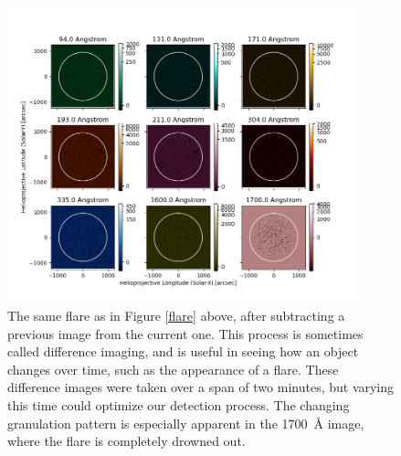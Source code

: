 \documentclass[12pt, letterpaper]{article}
\begin{document}
\begin{figure}[ht]
	\includegraphics[width=0.9\textwidth]{figures/0819_flare_diff.png}
	\centering
	\caption{The same flare as in Figure \ref{flare} above, after subtracting a previous image from the current one. This process is sometimes called difference imaging, and is useful in seeing how an object changes over time, such as the appearance of a flare. These difference images were taken over a span of two minutes, but varying this time could optimize our detection process. The changing granulation pattern is especially apparent in the 1700~\AA{} image, where the flare is completely drowned out.}
	\label{flare_diff}
\end{figure}
\end{document}
